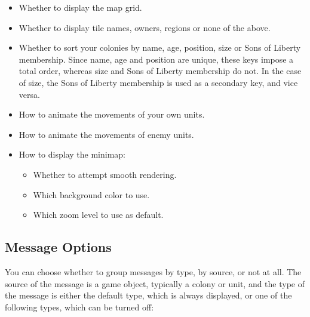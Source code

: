 \documentclass[12pt]{book}
\begin{document}
\begin{itemize}
\item Whether to display the map grid.

\item Whether to display tile names, owners, regions or none of the
  above.

\item Whether to sort your colonies by name, age, position, size or
Sons of Liberty membership. Since name, age and position are unique,
these keys impose a total order, whereas size and Sons of Liberty
membership do not. In the case of size, the Sons of Liberty membership
is used as a secondary key, and vice versa.

\item How to animate the movements of your own units.

\item How to animate the movements of enemy units.

\item How to display the minimap:

\begin{itemize}
\item Whether to attempt smooth rendering.

\item Which background color to use.

\item Which zoom level to use as default.
\end{itemize}

\end{itemize}

\hypertarget{message options}{\subsection{Message Options}}

You can choose whether to group messages by type, by source, or not at
all. The source of the message is a game object, typically a colony or
unit, and the type of the message is either the default type, which is
always displayed, or one of the following types, which can be turned
off:
\end{document}
